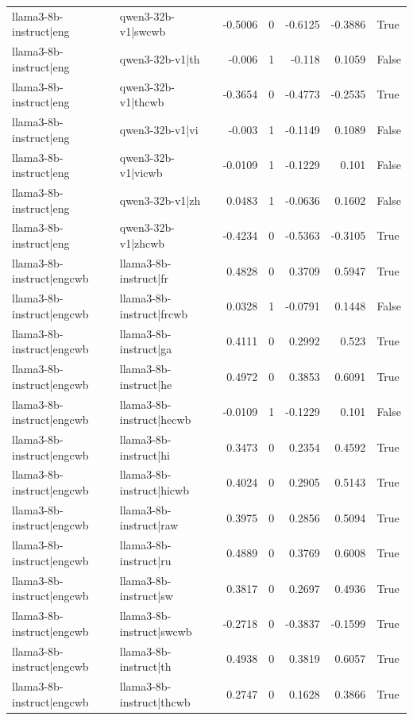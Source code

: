 \begin{table}
\begin{tabular}{l l r r r r l}
llama3-8b-instruct|eng & qwen3-32b-v1|swcwb & -0.5006 & 0 & -0.6125 & -0.3886 & True \\
llama3-8b-instruct|eng & qwen3-32b-v1|th & -0.006 & 1 & -0.118 & 0.1059 & False \\
llama3-8b-instruct|eng & qwen3-32b-v1|thcwb & -0.3654 & 0 & -0.4773 & -0.2535 & True \\
llama3-8b-instruct|eng & qwen3-32b-v1|vi & -0.003 & 1 & -0.1149 & 0.1089 & False \\
llama3-8b-instruct|eng & qwen3-32b-v1|vicwb & -0.0109 & 1 & -0.1229 & 0.101 & False \\
llama3-8b-instruct|eng & qwen3-32b-v1|zh & 0.0483 & 1 & -0.0636 & 0.1602 & False \\
llama3-8b-instruct|eng & qwen3-32b-v1|zhcwb & -0.4234 & 0 & -0.5363 & -0.3105 & True \\
llama3-8b-instruct|engcwb & llama3-8b-instruct|fr & 0.4828 & 0 & 0.3709 & 0.5947 & True \\
llama3-8b-instruct|engcwb & llama3-8b-instruct|frcwb & 0.0328 & 1 & -0.0791 & 0.1448 & False \\
llama3-8b-instruct|engcwb & llama3-8b-instruct|ga & 0.4111 & 0 & 0.2992 & 0.523 & True \\
llama3-8b-instruct|engcwb & llama3-8b-instruct|he & 0.4972 & 0 & 0.3853 & 0.6091 & True \\
llama3-8b-instruct|engcwb & llama3-8b-instruct|hecwb & -0.0109 & 1 & -0.1229 & 0.101 & False \\
llama3-8b-instruct|engcwb & llama3-8b-instruct|hi & 0.3473 & 0 & 0.2354 & 0.4592 & True \\
llama3-8b-instruct|engcwb & llama3-8b-instruct|hicwb & 0.4024 & 0 & 0.2905 & 0.5143 & True \\
llama3-8b-instruct|engcwb & llama3-8b-instruct|raw & 0.3975 & 0 & 0.2856 & 0.5094 & True \\
llama3-8b-instruct|engcwb & llama3-8b-instruct|ru & 0.4889 & 0 & 0.3769 & 0.6008 & True \\
llama3-8b-instruct|engcwb & llama3-8b-instruct|sw & 0.3817 & 0 & 0.2697 & 0.4936 & True \\
llama3-8b-instruct|engcwb & llama3-8b-instruct|swcwb & -0.2718 & 0 & -0.3837 & -0.1599 & True \\
llama3-8b-instruct|engcwb & llama3-8b-instruct|th & 0.4938 & 0 & 0.3819 & 0.6057 & True \\
llama3-8b-instruct|engcwb & llama3-8b-instruct|thcwb & 0.2747 & 0 & 0.1628 & 0.3866 & True \\

\end{tabular}
\end{table}
